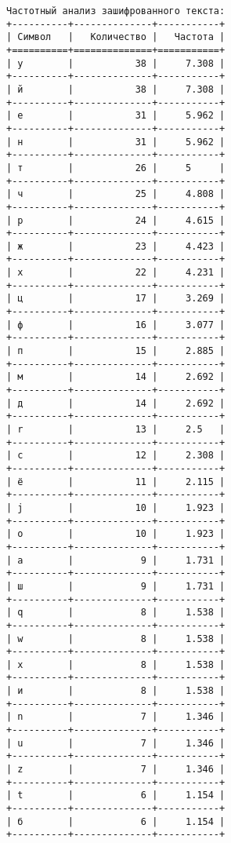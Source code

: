 \documentclass[a4paper, 14pt]{report}
\begin{document}
\begin{verbatim}
Частотный анализ зашифрованного текста:
+----------+--------------+-----------+
| Символ   |   Количество |   Частота |
+==========+==============+===========+
| у        |           38 |     7.308 |
+----------+--------------+-----------+
| й        |           38 |     7.308 |
+----------+--------------+-----------+
| е        |           31 |     5.962 |
+----------+--------------+-----------+
| н        |           31 |     5.962 |
+----------+--------------+-----------+
| т        |           26 |     5     |
+----------+--------------+-----------+
| ч        |           25 |     4.808 |
+----------+--------------+-----------+
| р        |           24 |     4.615 |
+----------+--------------+-----------+
| ж        |           23 |     4.423 |
+----------+--------------+-----------+
| х        |           22 |     4.231 |
+----------+--------------+-----------+
| ц        |           17 |     3.269 |
+----------+--------------+-----------+
| ф        |           16 |     3.077 |
+----------+--------------+-----------+
| п        |           15 |     2.885 |
+----------+--------------+-----------+
| м        |           14 |     2.692 |
+----------+--------------+-----------+
| д        |           14 |     2.692 |
+----------+--------------+-----------+
| r        |           13 |     2.5   |
+----------+--------------+-----------+
| с        |           12 |     2.308 |
+----------+--------------+-----------+
| ё        |           11 |     2.115 |
+----------+--------------+-----------+
| j        |           10 |     1.923 |
+----------+--------------+-----------+
| о        |           10 |     1.923 |
+----------+--------------+-----------+
| а        |            9 |     1.731 |
+----------+--------------+-----------+
| ш        |            9 |     1.731 |
+----------+--------------+-----------+
| q        |            8 |     1.538 |
+----------+--------------+-----------+
| w        |            8 |     1.538 |
+----------+--------------+-----------+
| x        |            8 |     1.538 |
+----------+--------------+-----------+
| и        |            8 |     1.538 |
+----------+--------------+-----------+
| n        |            7 |     1.346 |
+----------+--------------+-----------+
| u        |            7 |     1.346 |
+----------+--------------+-----------+
| z        |            7 |     1.346 |
+----------+--------------+-----------+
| t        |            6 |     1.154 |
+----------+--------------+-----------+
| б        |            6 |     1.154 |
+----------+--------------+-----------+

\end{verbatim}
\end{document}
